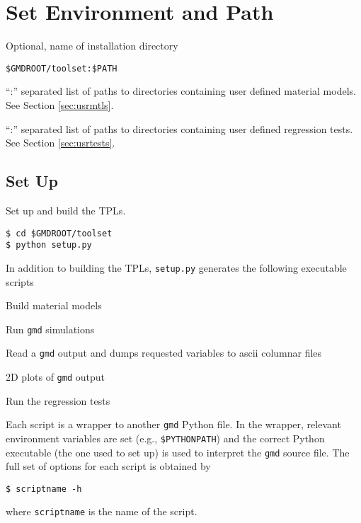 \documentclass[11pt]{report}
\newcommand{\gmd}{\texttt{gmd}}
\begin{document}
\section{Set Environment and Path}

\begin{description}[leftmargin=!,labelwidth=\widthof{\texttt{GMDTESTS}}]
  \item[\texttt{GMDROOT}] Optional, name of installation directory
  \item[\texttt{PATH}] \verb|$GMDROOT/toolset:$PATH|
  \item[\texttt{GMDMTLS}] ``:'' separated list of paths to directories
  containing user defined material models. See Section \ref{sec:usrmtls}.
  \item[\texttt{GMDTESTS}] ``:'' separated list of paths to directories
  containing user defined regression tests. See Section \ref{sec:usrtests}.
\end{description}

\subsection{Set Up}
Set up and build the TPLs.
%
\begin{verbatim}
$ cd $GMDROOT/toolset
$ python setup.py
\end{verbatim}
%
In addition to building the TPLs, \texttt{setup.py} generates the following
executable scripts
%
\begin{description}[leftmargin=!,labelwidth=\widthof{\texttt{buildmtls}}]
  \item[\texttt{buildmtls}] Build material models
  \item[\texttt{gmd}] Run \gmd{} simulations
  \item[\texttt{gmddump}] Read a \gmd{} output and dumps requested variables
  to ascii columnar files
  \item[\texttt{gmdviz}] 2D plots of \gmd{} output
  \item[\texttt{runtests}] Run the regression tests
\end{description}
%
Each script is a wrapper to another \gmd{} Python file. In the wrapper,
relevant environment variables are set (e.g., \verb:$PYTHONPATH:) and the
correct Python executable (the one used to set up) is used to interpret the
\gmd{} source file.  The full set of options for each script is obtained by
\begin{verbatim}
$ scriptname -h
\end{verbatim}
%
where \texttt{scriptname} is the name of the script.
\end{document}
